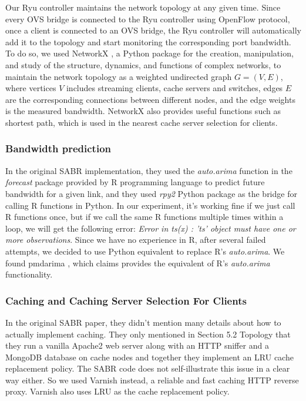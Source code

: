 \documentclass[12pt]{article}
\begin{document}
Our Ryu controller maintains the network topology at any given time. Since every OVS bridge is connected to the Ryu controller using OpenFlow protocol, once a client is connected to an OVS bridge, the Ryu controller will automatically add it to the topology and start monitoring the corresponding port bandwidth. To do so, we used NetworkX \cite{networkx}, a Python package for the creation, manipulation, and study of the structure, dynamics, and functions of complex networks, to maintain the network topology as a weighted undirected graph $G=(V, E)$, where vertices $V$ includes streaming clients, cache servers and switches, edges $E$ are the corresponding connections between different nodes, and the edge weights is the measured bandwidth. NetworkX also provides useful functions such as shortest path, which is used in the nearest cache server selection for clients. 

\subsubsection{Bandwidth prediction}
In the original SABR implementation, they used the \textit{auto.arima} function in the \textit{forecast} package provided by R programming language to predict future bandwidth for a given link, and they used \textit{rpy2} Python package as the bridge for calling R functions in Python. In our experiment, it's working fine if we just call R functions once, but if we call the same R functions multiple times within a loop, we will get the following error: \textit{Error in ts(x) : 'ts' object must have one or more observations}. Since we have no experience in R, after several failed attempts, we decided to use Python equivalent to replace R's \textit{auto.arima}. We found pmdarima \cite{pmdarima}, which claims provides the equivalent of R's \textit{auto.arima} functionality. 

\subsubsection{Caching and Caching Server Selection For Clients}
In the original SABR paper, they didn't mention many details about how to actually implement caching. They only mentioned in Section 5.2 Topology that they run a vanilla Apache2 web server along with an HTTP sniffer and a MongoDB database on cache nodes and together they implement an LRU cache replacement policy. The SABR code does not self-illustrate this issue in a clear way either. So we used Varnish \cite{varnish} instead, a reliable and fast caching HTTP reverse proxy. Varnish also uses LRU as the cache replacement policy. 
\end{document}
